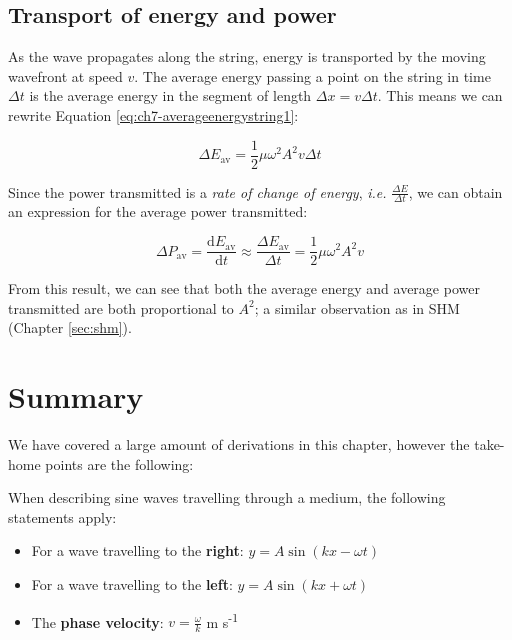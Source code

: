\documentclass[
]{book}
\providecommand{\tightlist}{%
  \setlength{\itemsep}{0pt}\setlength{\parskip}{0pt}}
\begin{document}
\hypertarget{sec:ch7-transportenergypower}{%
\subsection{Transport of energy and power}\label{sec:ch7-transportenergypower}}

As the wave propagates along the string, energy is transported by the moving wavefront at speed \(v\). The average energy passing a point on the string in time \(\Delta t\) is the average energy in the segment of length \(\Delta x = v\Delta t\). This means we can rewrite Equation \eqref{eq:ch7-averageenergystring1}:

\begin{equation}
\Delta E_{\mathrm{av}} = \frac{1}{2}\mu \omega^2 A^2 v \Delta t
\label{eq:ch7-averageenergystring2}
\end{equation}

Since the power transmitted is a \emph{rate of change of energy}, \emph{i.e.} \(\frac{\Delta E}{\Delta t}\), we can obtain an expression for the average power transmitted:

\begin{equation}
\Delta P_{\mathrm{av}} = \frac{\mathrm{d} E_{\mathrm{av}}}{\mathrm{d}t} \approx \frac{\Delta E_{\mathrm{av}}}{\Delta t} = \frac{1}{2}\mu \omega^2 A^2 v
\label{eq:ch7-averagepowerstring1}
\end{equation}

From this result, we can see that both the average energy and average power transmitted are both proportional to \(A^2\); a similar observation as in SHM (Chapter \ref{sec:shm}).

\hypertarget{sec:ch7-summary}{%
\section{Summary}\label{sec:ch7-summary}}

We have covered a large amount of derivations in this chapter, however the take-home points are the following:

When describing sine waves travelling through a medium, the following statements apply:

\begin{itemize}
\tightlist
\item
  For a wave travelling to the \textbf{right}: \(y = A\sin(kx-\omega t)\)
\item
  For a wave travelling to the \textbf{left}: \(y = A\sin(kx+\omega t)\)
\item
  The \textbf{phase velocity}: \(v = \frac{\omega}{k}\) m s\textsuperscript{-1}
\end{itemize}
\end{document}
